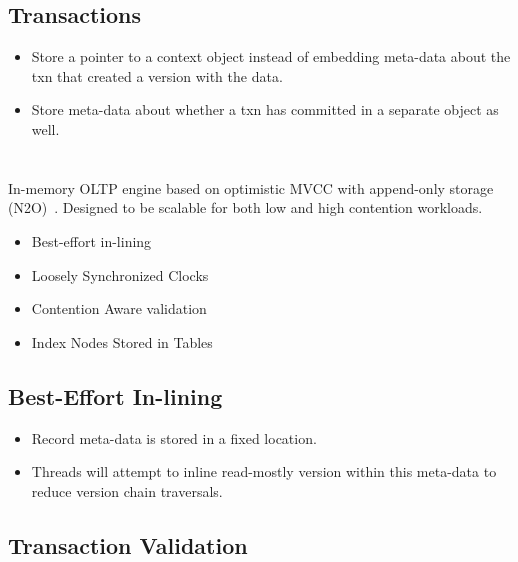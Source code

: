 \documentclass[11pt]{article}
\begin{document}
\subsection*{Transactions}
\begin{itemize}
    \item
    Store a pointer to a context object instead of embedding meta-data about the txn that created a version with the data.

    \item
    Store meta-data about whether a txn has committed in a separate object as well.
\end{itemize}

\section{}
In-memory OLTP engine based on optimistic MVCC with append-only storage (N2O)~\cite{p21-lim}.
Designed to be scalable for both low and high contention workloads.
\begin{itemize}
    \item Best-effort in-lining
    \item Loosely Synchronized Clocks
    \item Contention Aware validation
    \item Index Nodes Stored in Tables
\end{itemize}

\subsection*{Best-Effort In-lining}
\begin{itemize}
    \item
    Record meta-data is stored in a fixed location.
    
    \item
    Threads will attempt to inline read-mostly version within this meta-data to reduce 
    version chain traversals.
\end{itemize}

\subsection*{Transaction Validation}
\end{document}
